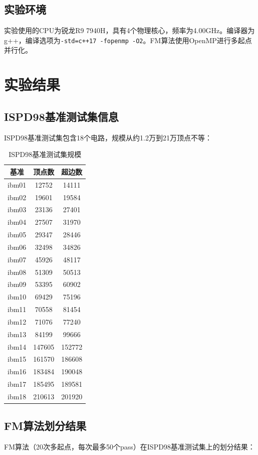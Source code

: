 \documentclass{SYSUReport}
\begin{document}
\subsection{实验环境}
实验使用的CPU为锐龙R9 7940H，具有4个物理核心，频率为4.00GHz。编译器为g++，编译选项为\texttt{-std=c++17 -fopenmp -O2}。FM算法使用OpenMP进行多起点并行化。

\section{实验结果}

\subsection{ISPD98基准测试集信息}
ISPD98基准测试集包含18个电路，规模从约1.2万到21万顶点不等：

\begin{table}[H]
\centering
\caption{ISPD98基准测试集规模}
\begin{tabular}{|c|c|c|}
\hline
基准 & 顶点数 & 超边数 \\
\hline
ibm01 & 12752 & 14111 \\
\hline
ibm02 & 19601 & 19584 \\
\hline
ibm03 & 23136 & 27401 \\
\hline
ibm04 & 27507 & 31970 \\
\hline
ibm05 & 29347 & 28446 \\
\hline
ibm06 & 32498 & 34826 \\
\hline
ibm07 & 45926 & 48117 \\
\hline
ibm08 & 51309 & 50513 \\
\hline
ibm09 & 53395 & 60902 \\
\hline
ibm10 & 69429 & 75196 \\
\hline
ibm11 & 70558 & 81454 \\
\hline
ibm12 & 71076 & 77240 \\
\hline
ibm13 & 84199 & 99666 \\
\hline
ibm14 & 147605 & 152772 \\
\hline
ibm15 & 161570 & 186608 \\
\hline
ibm16 & 183484 & 190048 \\
\hline
ibm17 & 185495 & 189581 \\
\hline
ibm18 & 210613 & 201920 \\
\hline
\end{tabular}
\end{table}

\subsection{FM算法划分结果}
FM算法（20次多起点，每次最多50个pass）在ISPD98基准测试集上的划分结果：
\end{document}
